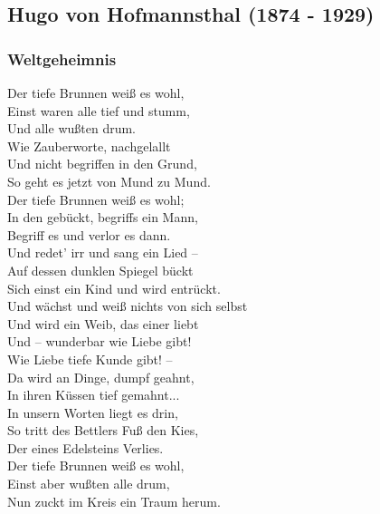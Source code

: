 \documentclass[11pt,a4paper,oneside]{article}
\begin{document}
	\begin{hinweis}
		\subsection*{Hugo von Hofmannsthal (1874 - 1929)}
		\subsubsection*{Weltgeheimnis}
		Der tiefe Brunnen weiß es wohl,\\
		Einst waren alle tief und stumm,\\
		Und alle wußten drum.\\
		
		Wie Zauberworte, nachgelallt\\
		Und nicht begriffen in den Grund,\\
		So geht es jetzt von Mund zu Mund.\\
		
		Der tiefe Brunnen weiß es wohl;\\
		In den gebückt, begriffs ein Mann,\\
		Begriff es und verlor es dann.\\
		
		Und redet' irr und sang ein Lied –\\
		Auf dessen dunklen Spiegel bückt\\
		Sich einst ein Kind und wird entrückt.\\
		
		Und wächst und weiß nichts von sich selbst\\
		Und wird ein Weib, das einer liebt\\
		Und – wunderbar wie Liebe gibt!\\
		
		Wie Liebe tiefe Kunde gibt! – \\
		Da wird an Dinge, dumpf geahnt,\\
		In ihren Küssen tief gemahnt...\\
		
		In unsern Worten liegt es drin,\\
		So tritt des Bettlers Fuß den Kies,\\
		Der eines Edelsteins Verlies.\\
		
		Der tiefe Brunnen weiß es wohl, \\
		Einst aber wußten alle drum,\\
		Nun zuckt im Kreis ein Traum herum.\\
	\end{hinweis}
	
\end{document}
